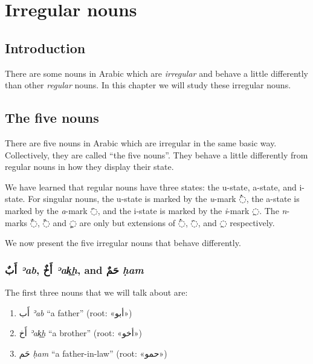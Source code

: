 \documentclass[
  10pt,
]{book}
\providecommand{\tightlist}{%
  \setlength{\itemsep}{0pt}\setlength{\parskip}{0pt}}
\begin{document}
\chapter{Irregular nouns}\label{irregular-nouns}

\section{Introduction}\label{introduction-11}

There are some nouns in Arabic which are \emph{irregular} and behave a little differently than other \emph{regular} nouns. In this chapter we will study these irregular nouns.

\section{The five nouns}\label{the-five-nouns}

There are five nouns in Arabic which are irregular in the same basic way. Collectively, they are called \enquote{the five nouns}.
They behave a little differently from regular nouns in how they display their state.

We have learned that regular nouns have three states: the u-state, a-state, and i-state. For singular nouns, the u-state is marked by the \emph{u}-mark \foreignlanguage{arabic}{◌ُ}, the a-state is marked by the \emph{a}-mark \foreignlanguage{arabic}{◌َ}, and the i-state is marked by the \emph{i}-mark \foreignlanguage{arabic}{◌ِ}. The \emph{n}-marks \foreignlanguage{arabic}{◌ٌ}, \foreignlanguage{arabic}{◌ً} and \foreignlanguage{arabic}{◌ٍ} are only but extensions of \foreignlanguage{arabic}{◌ُ}, \foreignlanguage{arabic}{◌َ}, and \foreignlanguage{arabic}{◌ِ} respectively.

We now present the five irregular nouns that behave differently.

\subsection{\texorpdfstring{\foreignlanguage{arabic}{أَبٌ} \emph{ʾab}, \foreignlanguage{arabic}{أَخٌ} \emph{ʾak͟h}, and \foreignlanguage{arabic}{حَمٌ} \emph{ḥam}}{أَبٌ ʾab, أَخٌ ʾak͟h, and حَمٌ ḥam}}\label{ux623ux628-eab-ux623ux62e-eax-and-ux62dux645-ham}

The first three nouns that we will talk about are:

\begin{enumerate}
\def\labelenumi{\roman{enumi}.}
\tightlist
\item
  \foreignlanguage{arabic}{أَب} \emph{ʾab} \enquote{a father} (root: \foreignlanguage{arabic}{«أبو»})
\item
  \foreignlanguage{arabic}{أَخ} \emph{ʾak͟h} \enquote{a brother} (root: \foreignlanguage{arabic}{«أخو»})
\item
  \foreignlanguage{arabic}{حَم} \emph{ḥam} \enquote{a father-in-law} (root: \foreignlanguage{arabic}{«حمو»})
\end{enumerate}
\end{document}
